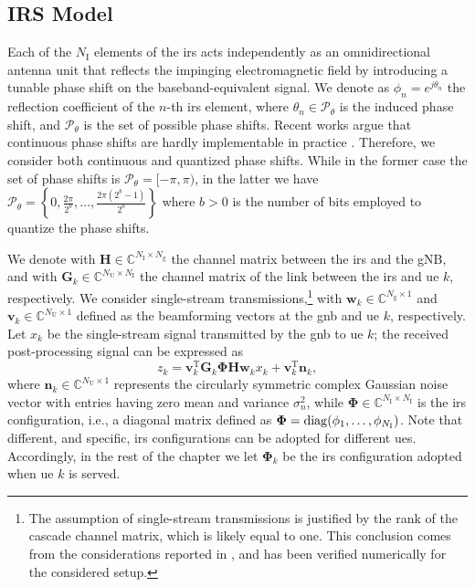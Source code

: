 \subsection{IRS Model}\label{sec:irsmodel}
Each of the $N_{\mathrm I}$ elements of the \gls{irs} acts independently as an omnidirectional antenna unit that reflects the impinging electromagnetic field by introducing a tunable phase shift on the baseband-equivalent signal. We denote as $\phi_n=e^{j\theta_n}$ the reflection coefficient of the $n$-th \gls{irs} element, where $\theta_n \in \mathcal{P}_{\theta}$ is the induced phase shift, and $\mathcal{P}_{\theta}$ is the set of possible phase shifts. 
Recent works argue that continuous phase shifts are hardly implementable in practice \cite{Tan2018}. Therefore, we consider both continuous and quantized phase shifts. While in the former case the set of phase shifts is $\mathcal{P}_{\theta}= [-\pi, \pi)$, in the latter we have 
$\mathcal{P}_{\theta} = \left\{0, \frac{2\pi}{2^b},\ldots,\frac{2\pi(2^b-1)}{2^b} \right\}$ where $b>0$ is the number of bits employed to quantize the phase shifts. 

We denote with $\bm{H} \in \mathbb{C}^{N_{\mathrm I} \times N_{\mathrm g}}$ the channel matrix between the \gls{irs} and the gNB, and with $\bm{G}_k \in \mathbb{C}^{N_{\mathrm U} \times N_{\mathrm I}}$ the channel matrix of the link between the \gls{irs} and \gls{ue} $k$, respectively.
We consider single-stream transmissions,\footnote{The assumption of single-stream transmissions is justified by the rank of the cascade channel matrix, which is likely equal to one. This conclusion comes from the considerations reported in \cite{he2020cascaded, rains2023ris,rappaport2017investigation}, and has been verified numerically for the considered setup.} with $\bm{w}_k \in \mathbb{C}^{N_{\mathrm g}\times 1}$ and $\bm{v}_k\in \mathbb{C}^{N_{\mathrm U}\times 1}$ defined as the beamforming vectors at the \gls{gnb} and \gls{ue} $k$, respectively.
Let $x_k$ be the single-stream signal transmitted by the \gls{gnb} to \gls{ue} $k$; the received post-processing signal can be expressed as
\begin{equation}
    z_k = \bm{v}_k^{\mathrm T} \bm{G}_k \bm{\Phi} \bm{H}  \bm{w}_kx_k + \bm{v}_k^{\mathrm T} \bm{n}_{k},
\end{equation}
where $\bm{n}_k\in \mathbb{C}^{N_{\mathrm U}\times 1}$ represents the circularly symmetric complex Gaussian noise vector with entries having zero mean and variance $\sigma^2_{n}$, while $\bm{\Phi} \in \mathbb{C}^{N_{\mathrm I}\times N_{\mathrm I}}$ is the {\gls{irs} configuration}, i.e., a diagonal matrix defined as $\bm{\Phi} = \operatorname*{diag}(\phi_1,\ldots,\phi_{N_{\mathrm I}})$.
Note that different, and specific, \gls{irs} configurations can be adopted for different \glspl{ue}. Accordingly, in the rest of the chapter we let $\bm{\Phi}_k$ be the \gls{irs} configuration adopted when \gls{ue} $k$ is served.

